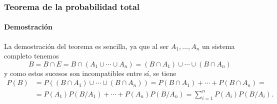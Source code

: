 \begin{frame}
\frametitle{Teorema de la probabilidad total}
\framesubtitle{Demostración}
La demostración del teorema es sencilla, ya que al ser $A_1,\ldots,A_n$ un sistema completo tenemos
\[
B = B\cap E = B\cap (A_1\cup \cdots \cup A_n) = (B\cap A_1)\cup \cdots \cup (B\cap A_n)
\]
y como estos sucesos son incompatibles entre sí, se tiene
\begin{align*}
P(B) &= P((B\cap A_1)\cup \cdots \cup (B\cap A_n)) = P(B\cap A_1)+\cdots + P(B\cap A_n) =\\
&= P(A_1)P(B/A_1)+\cdots + P(A_n)P(B/A_n) = \sum_{i=1}^n P(A_i)P(B/A_i).
\end{align*}
	
\begin{center}
\end{center}

\end{frame}


